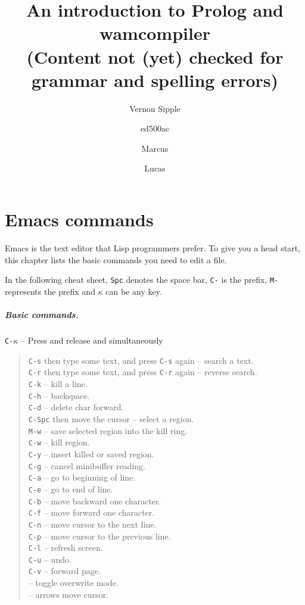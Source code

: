 \documentclass[a4paper,12pt]{book}
\title{An introduction to Prolog and wamcompiler\\
{\normalsize (Content not (yet) checked for grammar and spelling errors)}}
\author{Vernon Sipple \and ed500ac \and Marcus \and Lucas}
\date{}
\begin{document}
\maketitle
\thispagestyle{empty}

\mainmatter

\chapter{Emacs commands}
Emacs is the text editor that Lisp programmers prefer.
To give you a head start, this chapter lists the basic
commands you need to edit a file.

In the following cheat sheet, \verb|Spc| denotes
the space bar, \verb|C-| is the  prefix, \verb|M-| represents 
the   prefix and  $\kappa$ can be any key. 

\paragraph{Basic commands.} \verb|C-|$\kappa$ -- Press and release 
and \keys{$\kappa$} simultaneously
\begin{quote}
 \verb|C-s| then type some text, and press \verb|C-s| again 
  -- search a text.\\
 \verb|C-r| then type some text, and press \verb|C-r| again 
  -- reverse search.\\
 \verb|C-k| -- kill a line.\\
 \verb|C-h| -- backspace.\\
 \verb|C-d| -- delete char forward.\\ 
 \verb|C-Spc| then move the cursor -- select a region.\\
 \verb|M-w| -- save selected region into the kill ring. \\
 \verb|C-w| -- kill region.\\
 \verb|C-y| -- insert killed or saved region.\\
 \verb|C-g| -- cancel minibuffer reading.\\
 \verb|C-a| -- go to beginning of line.\\
 \verb|C-e| -- go to end of line.\\
 \verb|C-b| -- move backward one character.\\
 \verb|C-f| -- move forward one character.\\
 \verb|C-n| -- move cursor to the next line.\\
 \verb|C-p| -- move cursor to the previous line.\\
 \verb|C-l| -- refresh screen.\\
 \verb|C-u| -- undo. \\
 \verb|C-v| -- forward page.\\
  -- toggle overwrite mode.\\
 \keys{$\leftarrow$} \keys{$\rightarrow$} \keys{$\uparrow$} \keys{$\downarrow$} -- arrows move cursor.\\
\end{quote}
\end{document}
